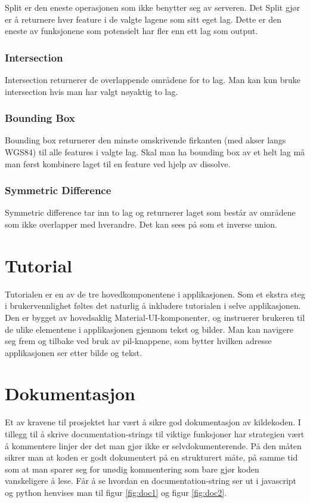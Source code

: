Split er den eneste operasjonen som ikke benytter seg av serveren. Det Split gjør er å returnere hver feature i de valgte lagene som sitt eget lag. Dette er den eneste av funksjonene som potensielt har fler enn ett lag som output. 

\subsubsection{Intersection}

Intersection returnerer de overlappende områdene for to lag. Man kan kun bruke intersection hvis man har valgt nøyaktig to lag. 

\subsubsection{Bounding Box}

Bounding box returnerer den minste omskrivende firkanten (med akser langs WGS84) til alle features i valgte lag. Skal man ha bounding box av et helt lag må man først kombinere laget til en feature ved hjelp av dissolve.  

\subsubsection{Symmetric Difference}

Symmetric difference tar inn to lag og returnerer laget som består av områdene som ikke overlapper med hverandre. Det kan sees på som et inverse union. 

\section{Tutorial}

Tutorialen er en av de tre hovedkomponentene i applikasjonen. Som et ekstra steg i brukervennlighet føltes det naturlig å inkludere tutorialen i selve applikasjonen. Den er bygget av hovedsaklig Material-UI-komponenter, og instruerer brukeren til de ulike elementene i applikasjonen gjennom tekst og bilder. Man kan navigere seg frem og tilbake ved bruk av pil-knappene, som bytter hvilken adresse applikasjonen ser etter bilde og tekst.  

\section{Dokumentasjon}

Et av kravene til prosjektet har vært å sikre god dokumentasjon av kildekoden. I tillegg til å skrive documentation-strings til viktige funksjoner har strategien vært å kommentere linjer der det man gjør ikke er selvdokumenterende. På den måten sikrer man at koden er godt dokumentert på en strukturert måte, på samme tid som at man sparer seg for unødig kommentering som bare gjør koden vanskeligere å lese. Får å se hvordan en documentation-string ser ut i javascript og python henvises man til figur \ref{fig:doc1} og figur \ref{fig:doc2}. 

